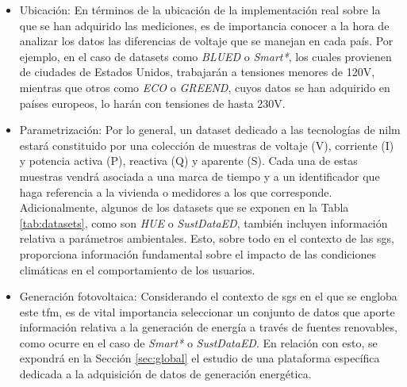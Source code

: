 \begin{itemize}
    \item Ubicación: En términos de la ubicación de la implementación real sobre la que se han adquirido las mediciones, es de importancia conocer a la hora de analizar los datos las diferencias de voltaje que se manejan en cada país. Por ejemplo, en el caso de datasets como \textit{BLUED} o \textit{Smart*}, los cuales provienen de ciudades de Estados Unidos, trabajarán a tensiones menores de 120V, mientras que otros como \textit{ECO} o \textit{GREEND}, cuyos datos se han adquirido en países europeos, lo harán con tensiones de hasta 230V. \cite{greend}
    \item Parametrización: Por lo general, un dataset dedicado a las tecnologías de \gls{nilm} estará constituido por una colección de muestras de voltaje (V), corriente (I) y potencia activa (P), reactiva (Q) y aparente (S). Cada una de estas muestras vendrá asociada a una marca de tiempo y a un identificador que haga referencia a la vivienda o medidores a los que corresponde. Adicionalmente, algunos de los datasets que se exponen en la Tabla \ref{tab:datasets}, como son \textit{HUE} o \textit{SustDataED}, también incluyen información relativa a parámetros ambientales. Esto, sobre todo en el contexto de las \gls{sg}s, proporciona información fundamental sobre el impacto de las condiciones climáticas en el comportamiento de los usuarios.
    \item Generación fotovoltaica: Considerando el contexto de \gls{sg}s en el que se engloba este \gls{tfm}, es de vital importancia seleccionar un conjunto de datos que aporte información relativa a la generación de energía a través de fuentes renovables, como ocurre en el caso de \textit{Smart*} o \textit{SustDataED}. En relación con esto, se expondrá en la Sección \ref{sec:global} el estudio de una plataforma específica dedicada a la adquisición de datos de generación energética.
\end{itemize}

